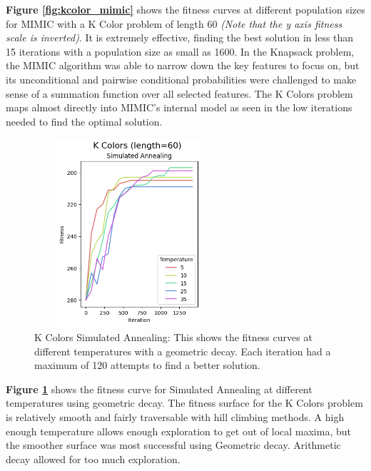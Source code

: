 \documentclass[letterpaper]{article} %
\begin{document}
\textbf{Figure \ref{fig:kcolor_mimic}} shows the fitness curves at different population sizes for MIMIC with a K Color problem of length 60  \emph{(Note that the y axis fitness scale is inverted)}.  It is extremely effective, finding the best solution in less than 15 iterations with a population size as small as 1600.  In the Knapsack problem, the MIMIC algorithm was able to narrow down the key features to focus on, but its unconditional and pairwise conditional probabilities were challenged to make sense of a summation function over all selected features. The K Colors problem maps almost directly into MIMIC's internal model as seen in the low iterations needed to find the optimal solution. 

\begin{figure}[!htb]
\centering
\includegraphics[width=2.75in, height=2.75in]{figures/K_Colors_length=60_Simulated_Annealing_l_60_ma_300_d_geom_t_5__10__15__25__35_.png}
\caption{K Colors Simulated Annealing: This shows the fitness curves at different temperatures with a geometric decay. Each iteration had a maximum of 120 attempts to find a better solution. }
\label{fig:kcolor_sa}
\end{figure}

\textbf{Figure \ref{fig:kcolor_sa}} shows the fitness curve for Simulated Annealing at different temperatures using geometric decay.  The fitness surface for the K Colors problem is relatively smooth and fairly traversable with hill climbing methods.  A high enough temperature allows enough exploration to get out of local maxima, but the smoother surface was most successful using Geometric decay.  Arithmetic decay allowed for too much exploration.
\end{document}
